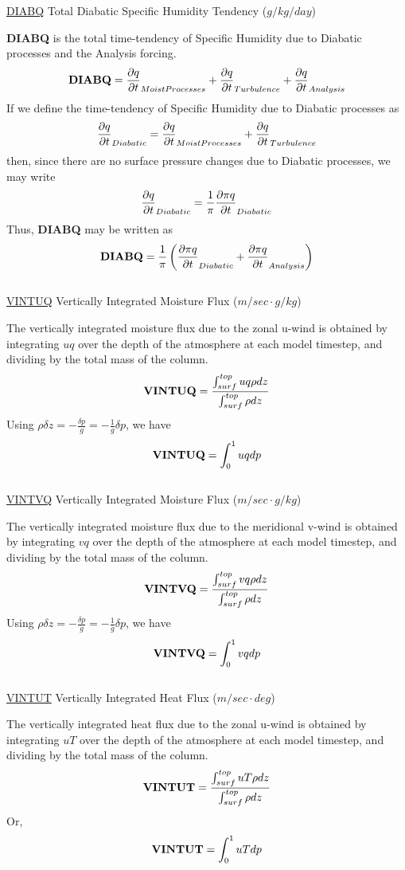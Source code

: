 \noindent
{ \underline {DIABQ} Total Diabatic Specific Humidity Tendency  ($g/kg/day$) }

\noindent
{\bf DIABQ} is the total time-tendency of Specific Humidity due to Diabatic processes
and the Analysis forcing.
\[
{\bf DIABQ} = \frac{\partial q}{\partial t}_{Moist Processes} + \frac{\partial q}{\partial t}_{Turbulence} + \frac{\partial q}{\partial t}_{Analysis} 
\]
If we define the time-tendency of Specific Humidity due to Diabatic processes as
\[
\frac{\partial q}{\partial t}_{Diabatic} = \frac{\partial q}{\partial t}_{Moist Processes} + \frac{\partial q}{\partial t}_{Turbulence}
\]
then, since there are no surface pressure changes due to Diabatic processes, we may write
\[
\frac{\partial q}{\partial t}_{Diabatic} = \frac{1}{\pi}\frac{\partial \pi q}{\partial t}_{Diabatic}
\]
Thus, {\bf DIABQ} may be written as
\[
{\bf DIABQ} = \frac{1}{\pi} \left( \frac{\partial \pi q}{\partial t}_{Diabatic} + \frac{\partial \pi q}{\partial t}_{Analysis} \right)
\]
\\

\noindent
{ \underline {VINTUQ} Vertically Integrated Moisture Flux ($m/sec \cdot g/kg$) }

\noindent
The vertically integrated moisture flux due to the zonal u-wind is obtained by integrating
$u q$ over the depth of the atmosphere at each model timestep, 
and dividing by the total mass of the column.
\[
{\bf VINTUQ} = \frac{ \int_{surf}^{top} u q \rho dz  } { \int_{surf}^{top} \rho dz  }
\]
Using $\rho \delta z = -\frac{\delta p}{g} = - \frac{1}{g} \delta p$, we have 
\[
{\bf VINTUQ} = { \int_0^1 u q dp  }
\]
\\


\noindent
{ \underline {VINTVQ} Vertically Integrated Moisture Flux ($m/sec \cdot g/kg$) }

\noindent
The vertically integrated moisture flux due to the meridional v-wind is obtained by integrating
$v q$ over the depth of the atmosphere at each model timestep, 
and dividing by the total mass of the column.
\[
{\bf VINTVQ} = \frac{ \int_{surf}^{top} v q \rho dz  } { \int_{surf}^{top} \rho dz  }
\]
Using $\rho \delta z = -\frac{\delta p}{g} = - \frac{1}{g} \delta p$, we have 
\[
{\bf VINTVQ} = { \int_0^1 v q dp  }
\]
\\


\noindent
{ \underline {VINTUT} Vertically Integrated Heat Flux ($m/sec \cdot deg$) }

\noindent
The vertically integrated heat flux due to the zonal u-wind is obtained by integrating
$u T$ over the depth of the atmosphere at each model timestep, 
and dividing by the total mass of the column.
\[
{\bf VINTUT} = \frac{ \int_{surf}^{top} u T \rho dz  } { \int_{surf}^{top} \rho dz  }
\]
Or,
\[
{\bf VINTUT} = { \int_0^1 u T dp  }
\]
\\

